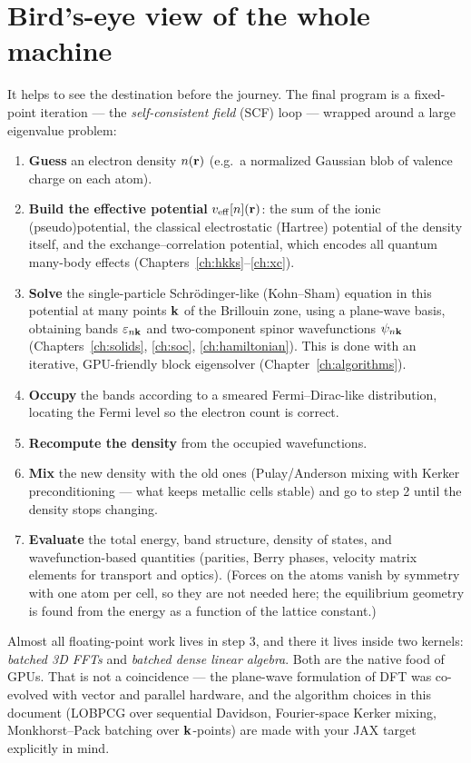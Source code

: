 \section{Bird's-eye view of the whole machine}

It helps to see the destination before the journey. The final program is a
fixed-point iteration --- the \emph{self-consistent field} (SCF) loop ---
wrapped around a large eigenvalue problem:

\begin{enumerate}[leftmargin=2em]
\item \textbf{Guess} an electron density $n(\mathbf{r})$ (e.g.\ a normalized Gaussian
blob of valence charge on each atom).
\item \textbf{Build the effective potential} $v_{\mathrm{eff}}[n](\mathbf{r})$: the sum of the
ionic (pseudo)potential, the classical electrostatic (Hartree) potential of
the density itself, and the exchange--correlation potential, which encodes
all quantum many-body effects (Chapters~\ref{ch:hkks}--\ref{ch:xc}).
\item \textbf{Solve} the single-particle Schr\"odinger-like (Kohn--Sham)
equation in this potential at many points $\mathbf{k}$ of the Brillouin zone, using
a plane-wave basis, obtaining bands $\varepsilon_{n\mathbf{k}}$ and two-component
spinor wavefunctions $\psi_{n\mathbf{k}}$ (Chapters~\ref{ch:solids},
\ref{ch:soc}, \ref{ch:hamiltonian}). This is done with an iterative,
GPU-friendly block eigensolver (Chapter~\ref{ch:algorithms}).
\item \textbf{Occupy} the bands according to a smeared Fermi--Dirac-like
distribution, locating the Fermi level so the electron count is correct.
\item \textbf{Recompute the density} from the occupied wavefunctions.
\item \textbf{Mix} the new density with the old ones (Pulay/Anderson mixing
with Kerker preconditioning --- what keeps metallic cells stable) and go to step 2 until
the density stops changing.
\item \textbf{Evaluate} the total energy, band structure, density of
states, and wavefunction-based quantities (parities, Berry phases,
velocity matrix elements for transport and optics). (Forces
on the atoms vanish by symmetry with one atom per cell, so they are not
needed here; the equilibrium geometry is found from the energy as a function
of the lattice constant.)
\end{enumerate}

Almost all floating-point work lives in step 3, and there it lives inside two
kernels: \emph{batched 3D FFTs} and \emph{batched dense linear algebra}. Both
are the native food of GPUs. That is not a coincidence --- the plane-wave
formulation of DFT was co-evolved with vector and parallel hardware, and the
algorithm choices in this document (LOBPCG over sequential Davidson,
Fourier-space Kerker mixing, Monkhorst--Pack batching over $\mathbf{k}$-points) are
made with your JAX target explicitly in mind.

